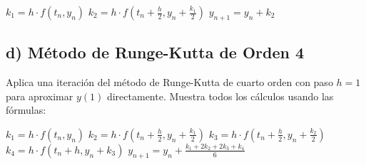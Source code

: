 \documentclass[12pt,a4paper]{article}
\begin{document}
$k_1 = h \cdot f(t_n, y_n)$
$k_2 = h \cdot f\left(t_n + \frac{h}{2}, y_n + \frac{k_1}{2}\right)$
$y_{n+1} = y_n + k_2$

\subsection*{d) Método de Runge-Kutta de Orden 4}
Aplica una iteración del método de Runge-Kutta de cuarto orden con paso $h = 1$ para aproximar $y(1)$ directamente. Muestra todos los cálculos usando las fórmulas:

$k_1 = h \cdot f(t_n, y_n)$
$k_2 = h \cdot f\left(t_n + \frac{h}{2}, y_n + \frac{k_1}{2}\right)$
$k_3 = h \cdot f\left(t_n + \frac{h}{2}, y_n + \frac{k_2}{2}\right)$
$k_4 = h \cdot f(t_n + h, y_n + k_3)$
$y_{n+1} = y_n + \frac{k_1 + 2k_2 + 2k_3 + k_4}{6}$
\end{document}
